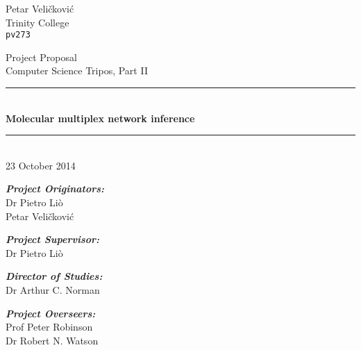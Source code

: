 \newcommand{\HRulee}{\rule{\linewidth}{0.5mm}}

\vfil

{\raggedleft \large Petar Veli\v{c}kovi\'{c} \\}
{\raggedleft \large Trinity College \\}
{\raggedleft \large \tt pv273 \\}

\vfil

\begin{center}

	{\Large \sc Project Proposal \\}
	\vspace{10pt}
	{\Large \sc Computer Science Tripos, Part II \\}
	\vspace{20pt}
	\HRulee \\[0.1cm]
	{\LARGE \bf Molecular multiplex network inference \\}
	\HRulee \\[20pt]
	{\Large 23 October 2014 \\}
	\vspace{20pt}
\end{center}

\vfil

\noindent\emph{\textbf{Project Originators:}}\\
	Dr Pietro Li\`{o}\\
	Petar Veli\v{c}kovi\'{c}\\

\vspace{10pt}
	
\noindent\emph{\textbf{Project Supervisor:}}\\
	Dr Pietro Li\`{o}\\

\vspace{10pt}
	
\noindent\emph{\textbf{Director of Studies:}}\\
	Dr Arthur C. Norman\\
	
\vspace{10pt}
	
\noindent\emph{\textbf{Project Overseers:}}\\
	Prof Peter Robinson\\
	Dr Robert N. Watson\\


